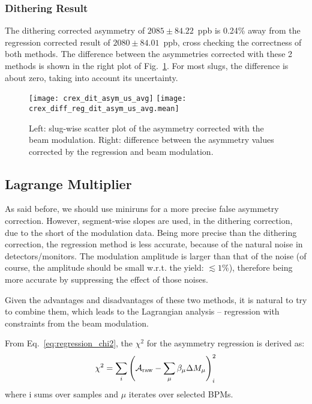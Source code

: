 \subsubsection{Dithering Result}
The dithering corrected asymmetry of $2085 \pm 84.22$~ppb is 0.24\% away from
the regression corrected result of $2080 \pm 84.01$~ppb, cross checking the correctness
of both methods. The difference between the asymmetries corrected with these 2 methods
is shown in the right plot of Fig.~\ref{fig:dit_result}. For most slugs, the difference
is about zero, taking into account its uncertainty.
\begin{figure}[H]
    \centering
    \texttt{[image: crex\_dit\_asym\_us\_avg]}
    \texttt{[image: crex\_diff\_reg\_dit\_asym\_us\_avg.mean]}
    \caption[Dithering corrected asymmetry]
    {Left: slug-wise scatter plot of the asymmetry corrected with the beam modulation.
    Right: difference between the asymmetry values corrected by the regression and
    beam modulation.}
    \label{fig:dit_result}
\end{figure}


\subsection{Lagrange Multiplier}
As said before, we should use miniruns for a more precise false asymmetry correction.
However, segment-wise slopes are used, in the dithering correction, due to the short of the
modulation data. Being more precise than the dithering correction, the regression method is 
less accurate, because of the natural noise in detectors/monitors. 
The modulation amplitude is larger than that of the noise (of course, the amplitude
should be small w.r.t. the yield: $\lesssim 1\%$), therefore being
more accurate by suppressing the effect of those noises.

Given the advantages and disadvantages of these two methods, it is natural to 
try to combine them, which leads to the Lagrangian analysis -- regression
with constraints from the beam modulation.

From Eq.~\ref{eq:regression_chi2}, the $\chi^2$ for the asymmetry regression is
derived as:
\begin{equation}
    \chi^2 = \sum_i \left( \mathcal{A}_{\text{raw}} - \sum_\mu \beta_\mu \Delta M_\mu \right)_i^2
\end{equation}
where i sums over samples and $\mu$ iterates over selected BPMs.

